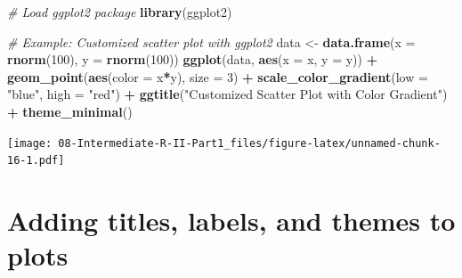 \documentclass[
]{book}
\newenvironment{Shaded}{\begin{snugshade}}{\end{snugshade}}
\newcommand{\AttributeTok}[1]{\textcolor[rgb]{0.13,0.29,0.53}{#1}}
\newcommand{\CommentTok}[1]{\textcolor[rgb]{0.56,0.35,0.01}{\textit{#1}}}
\newcommand{\DecValTok}[1]{\textcolor[rgb]{0.00,0.00,0.81}{#1}}
\newcommand{\FunctionTok}[1]{\textcolor[rgb]{0.13,0.29,0.53}{\textbf{#1}}}
\newcommand{\NormalTok}[1]{#1}
\newcommand{\OtherTok}[1]{\textcolor[rgb]{0.56,0.35,0.01}{#1}}
\newcommand{\SpecialCharTok}[1]{\textcolor[rgb]{0.81,0.36,0.00}{\textbf{#1}}}
\newcommand{\StringTok}[1]{\textcolor[rgb]{0.31,0.60,0.02}{#1}}
\begin{document}
\begin{Shaded}
\begin{Highlighting}[]

\CommentTok{\# Load ggplot2 package}
\FunctionTok{library}\NormalTok{(ggplot2)}

\CommentTok{\# Example: Customized scatter plot with ggplot2}
\NormalTok{data }\OtherTok{\textless{}{-}} \FunctionTok{data.frame}\NormalTok{(}\AttributeTok{x =} \FunctionTok{rnorm}\NormalTok{(}\DecValTok{100}\NormalTok{), }\AttributeTok{y =} \FunctionTok{rnorm}\NormalTok{(}\DecValTok{100}\NormalTok{))}
\FunctionTok{ggplot}\NormalTok{(data, }\FunctionTok{aes}\NormalTok{(}\AttributeTok{x =}\NormalTok{ x, }\AttributeTok{y =}\NormalTok{ y)) }\SpecialCharTok{+}
  \FunctionTok{geom\_point}\NormalTok{(}\FunctionTok{aes}\NormalTok{(}\AttributeTok{color =}\NormalTok{ x}\SpecialCharTok{*}\NormalTok{y), }\AttributeTok{size =} \DecValTok{3}\NormalTok{) }\SpecialCharTok{+}
  \FunctionTok{scale\_color\_gradient}\NormalTok{(}\AttributeTok{low =} \StringTok{"blue"}\NormalTok{, }\AttributeTok{high =} \StringTok{"red"}\NormalTok{) }\SpecialCharTok{+}
  \FunctionTok{ggtitle}\NormalTok{(}\StringTok{"Customized Scatter Plot with Color Gradient"}\NormalTok{) }\SpecialCharTok{+}
  \FunctionTok{theme\_minimal}\NormalTok{()}
\end{Highlighting}
\end{Shaded}

\texttt{[image: 08-Intermediate-R-II-Part1\_files/figure-latex/unnamed-chunk-16-1.pdf]}

\section*{Adding titles, labels, and themes to plots}\label{adding-titles-labels-and-themes-to-plots}
\end{document}
